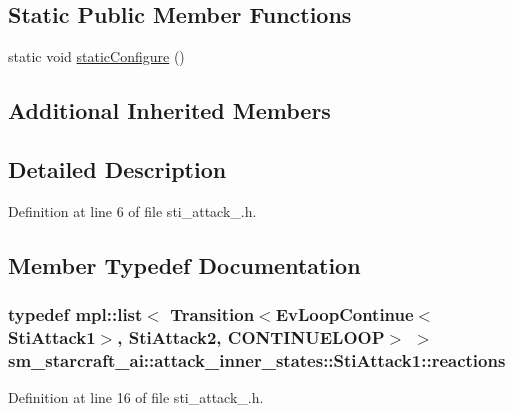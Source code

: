 \subsection*{Static Public Member Functions}
\begin{DoxyCompactItemize}
\item 
static void \hyperlink{structsm__starcraft__ai_1_1attack__inner__states_1_1StiAttack1_a880c622e62d84a29d09c4c0e7e8f4e69}{static\+Configure} ()
\end{DoxyCompactItemize}
\subsection*{Additional Inherited Members}


\subsection{Detailed Description}


Definition at line 6 of file sti\+\_\+attack\+\_.\+h.



\subsection{Member Typedef Documentation}
\subsubsection[{\texorpdfstring{reactions}{reactions}}]{\setlength{\rightskip}{0pt plus 5cm}typedef mpl\+::list$<$ Transition$<$Ev\+Loop\+Continue$<${\bf Sti\+Attack1}$>$, {\bf Sti\+Attack2}, C\+O\+N\+T\+I\+N\+U\+E\+L\+O\+OP$>$ $>$ {\bf sm\+\_\+starcraft\+\_\+ai\+::attack\+\_\+inner\+\_\+states\+::\+Sti\+Attack1\+::reactions}}\hypertarget{structsm__starcraft__ai_1_1attack__inner__states_1_1StiAttack1_a0aff5f8d7ce463d461248ff39f0265ea}{}\label{structsm__starcraft__ai_1_1attack__inner__states_1_1StiAttack1_a0aff5f8d7ce463d461248ff39f0265ea}


Definition at line 16 of file sti\+\_\+attack\+\_.\+h.



